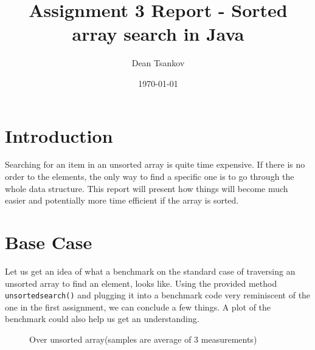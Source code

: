 \documentclass[a4paper,11pt]{article}
\begin{document}
\title{
    \textbf{Assignment 3 Report - Sorted array search in Java}
}
\author{Dean Tsankov}
\date{\today}

\maketitle

\section*{Introduction}
Searching for an item in an unsorted array is quite time expensive. If there is no order to the elements, the only way to find a specific one is to go through the whole data structure. This report will present how things will become much easier and potentially more time efficient if the array is sorted.

\section*{Base Case}

Let us get an idea of what a benchmark on the standard case of traversing an unsorted array to find an element, looks like. Using the provided method {\tt unsorted\textunderscore search()} and plugging it into a benchmark code very reminiscent of the one in the first assignment, we can conclude a few things. A plot of the benchmark could also help us get an understanding.

\begin{figure}[H]
    \centering
    \caption{Over unsorted array(samples are average of 3 measurements)}
    \label{fig:plot1}
\end{figure}
\end{document}
